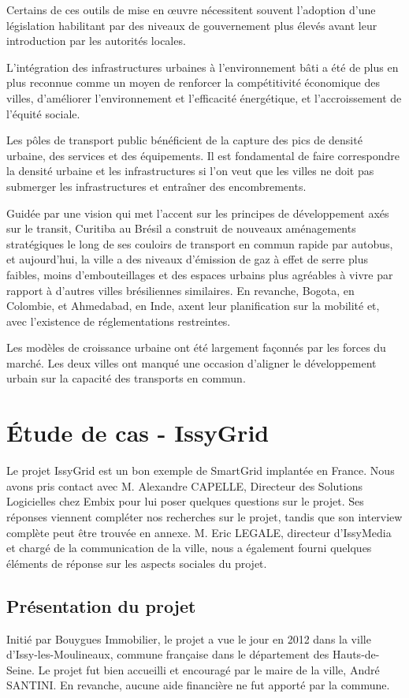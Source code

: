 Certains de ces outils de mise en œuvre nécessitent souvent l'adoption d'une législation habilitant par
des niveaux de gouvernement plus élevés avant leur introduction par les autorités locales.

L'intégration des infrastructures urbaines à l'environnement bâti a été de plus en plus
reconnue comme un moyen de renforcer la compétitivité économique des villes, d'améliorer
l'environnement et l'efficacité énergétique, et l'accroissement de l'équité sociale.

Les pôles de transport public bénéficient de la capture des pics de densité urbaine,
des services et des équipements. Il est fondamental de faire correspondre la densité urbaine et
les infrastructures si l'on veut que les villes ne doit pas submerger les infrastructures
et entraîner des encombrements.

Guidée par une vision qui met l'accent sur les principes de développement axés sur le transit,
Curitiba au Brésil a construit de nouveaux aménagements stratégiques le long de ses couloirs de transport
en commun rapide par autobus, et aujourd'hui, la ville a des niveaux d'émission de gaz à effet de serre plus
faibles, moins d'embouteillages et des espaces urbains plus agréables à vivre par rapport à d'autres
villes brésiliennes similaires. En revanche, Bogota, en Colombie, et Ahmedabad, en Inde, axent leur
planification sur la mobilité et, avec l'existence de réglementations restreintes.

Les modèles de croissance urbaine ont été largement façonnés par les forces du marché. Les deux villes
ont manqué une occasion d'aligner le développement urbain sur la capacité des transports en commun.

\section{Étude de cas - IssyGrid}
Le projet IssyGrid est un bon exemple de SmartGrid implantée en France.
Nous avons pris contact avec M. Alexandre CAPELLE, Directeur des Solutions Logicielles chez Embix pour
lui poser quelques questions sur le projet.
Ses réponses viennent compléter nos recherches sur le projet, tandis que son interview complète peut être
trouvée en annexe.
M. Eric LEGALE, directeur d’IssyMedia et chargé de la communication de la ville,
nous a également fourni quelques éléments de réponse sur les aspects sociales du projet.

\subsection{Présentation du projet}
Initié par Bouygues Immobilier, le projet a vue le jour en 2012 dans la ville d'Issy-les-Moulineaux,
commune française dans le département des Hauts-de-Seine.
Le projet fut bien accueilli et encouragé par le maire de la ville, André SANTINI.
En revanche, aucune aide financière ne fut apporté par la commune.

